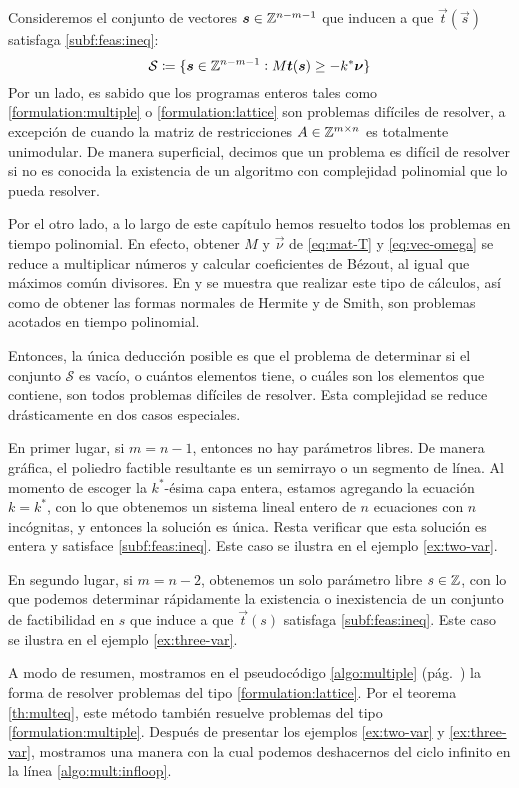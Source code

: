 Consideremos el conjunto de vectores $\boldsymbol{s} \in \mathbb{Z}^{n-m-1}$ que inducen a que $\vec{t}(\vec{s})$
satisfaga \eqref{subf:feas:ineq}:
\begin{equation*}
	\mathcal{S} \coloneq \lbrace \boldsymbol{s} \in \mathbb{Z}^{n-m-1} \vcentcolon M\boldsymbol{t}(\boldsymbol{s}) \geq -k^*\boldsymbol{\nu} \rbrace
\end{equation*}
Por un lado, es sabido que los programas enteros tales como \eqref{formulation:multiple} o
\eqref{formulation:lattice} son problemas difíciles de resolver, a excepción de cuando la matriz de
restricciones $A \in \mathbb{Z}^{m \times n}$ es totalmente unimodular. De manera superficial, decimos que
un problema es difícil de resolver si no es conocida la existencia de un algoritmo con complejidad
polinomial que lo pueda resolver.

Por el otro lado, a lo largo de este capítulo hemos resuelto todos los problemas en tiempo
polinomial. En efecto, obtener $M$ y $\vec{\nu}$ de \eqref{eq:mat-T} y \eqref{eq:vec-omega} se
reduce a multiplicar números y calcular coeficientes de Bézout, al igual que máximos común
divisores. En \cite{alex} y \cite{morris} se muestra que realizar este tipo de cálculos, así como de
obtener las formas normales de Hermite y de Smith, son problemas acotados en tiempo polinomial.

Entonces, la única deducción posible es que el problema de determinar si el conjunto $\mathcal{S}$
es vacío, o cuántos elementos tiene, o cuáles son los elementos que contiene, son todos problemas
difíciles de resolver. Esta complejidad se reduce drásticamente en dos casos especiales.

En primer lugar, si $m = n - 1$, entonces no hay parámetros libres. De manera gráfica, el poliedro
factible resultante es un semirrayo o un segmento de línea. Al momento de escoger la $k^*$-ésima
capa entera, estamos agregando la ecuación $k = k^*$, con lo que obtenemos un sistema lineal entero
de $n$ ecuaciones con $n$ incógnitas, y entonces la solución es única. Resta verificar que esta
solución es entera y satisface \eqref{subf:feas:ineq}. Este caso se ilustra en el ejemplo
\ref{ex:two-var}.

En segundo lugar, si $m = n - 2$, obtenemos un solo parámetro libre $s \in \mathbb{Z}$, con lo que podemos
determinar rápidamente la existencia o inexistencia de un conjunto de factibilidad en $s$ que induce
a que $\vec{t}(s)$ satisfaga \eqref{subf:feas:ineq}. Este caso se ilustra en el ejemplo
\ref{ex:three-var}.

A modo de resumen, mostramos en el pseudocódigo \ref{algo:multiple} (pág.~\pageref{algo:multiple})
la forma de resolver problemas del tipo \eqref{formulation:lattice}. Por el teorema \ref{th:multeq},
este método también resuelve problemas del tipo \eqref{formulation:multiple}. Después de presentar
los ejemplos \ref{ex:two-var} y \ref{ex:three-var}, mostramos una manera con la cual podemos
deshacernos del ciclo infinito en la línea \ref{algo:mult:infloop}.

